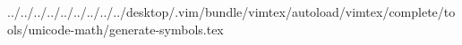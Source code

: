 ../../../../../../../../../desktop/.vim/bundle/vimtex/autoload/vimtex/complete/tools/unicode-math/generate-symbols.tex